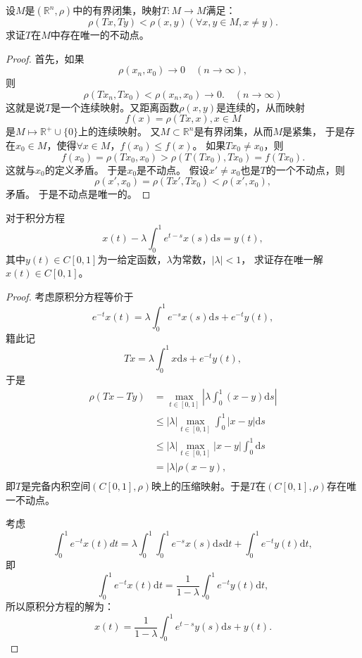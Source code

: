 \begin{exercise}\label{13}
设$M$是$(\mathbb{R}^n,\rho)$中的有界闭集，映射$T:M\rightarrow M$满足：
$$\rho(Tx,Ty)<\rho(x,y)(\forall x,y\in M,x\neq y).$$
求证$T$在$M$中存在唯一的不动点。
\end{exercise}

\begin{proof}
首先，如果$$\rho(x_n,x_0)\rightarrow0\quad(n\rightarrow\infty),$$
则$$\rho(Tx_n,Tx_0)<\rho(x_n,x_0)\rightarrow0.\quad(n\rightarrow\infty)$$
这就是说$T$是一个连续映射。又距离函数$\rho(x,y)$是连续的，从而映射
$$f(x)=\rho(Tx,x),x\in M$$是$M\mapsto\mathbb{R}^+\cup\{0\}$上的连续映射。
又$M\subset\mathbb{R}^n$是有界闭集，从而$M$是紧集，
于是存在$x_0\in M$，使得$\forall x\in M$，$f(x_0)\leq f(x)$。
如果$Tx_0\neq x_0$，则
$$f(x_0)=\rho(Tx_0,x_0)>\rho(T(Tx_0),Tx_0)=f(Tx_0).$$
这就与$x_0$的定义矛盾。
于是$x_0$是不动点。
假设$x'\neq x_0$也是$T$的一个不动点，则
$$\rho(x',x_0)=\rho(Tx',Tx_0)<\rho(x',x_0),$$
矛盾。
于是不动点是唯一的。
\end{proof}

\begin{exercise}
对于积分方程
$$x(t)-\lambda\int_0^1e^{t-s}x(s)\mathrm{d}s=y(t),$$
其中$y(t)\in C[0,1]$为一给定函数，$\lambda$为常数，$|\lambda|<1$，
求证存在唯一解$x(t)\in C[0,1]$。
\end{exercise}

\begin{proof}
考虑原积分方程等价于
$$e^{-t}x(t)=\lambda\int_0^1e^{-s}x(s)\mathrm{d}s+e^{-t}y(t),$$
籍此记
$$Tx=\lambda\int_0^1x\mathrm{d}s+e^{-t}y(t),$$
于是
\begin{align*}
\rho(Tx-Ty)&=\max_{t\in[0,1]}|\lambda\int_0^1(x-y)\mathrm{d}s|\\
&\leq|\lambda|\max_{t\in[0,1]}\int_0^1|x-y|\mathrm{d}s\\
&\leq|\lambda|\max_{t\in[0,1]}|x-y|\int_0^1\mathrm{d}s\\
&=|\lambda|\rho(x-y),\\
\end{align*}
即$T$是完备内积空间$(C[0,1],\rho)$映上的压缩映射。于是$T$在$(C[0,1],\rho)$存在唯一不动点。

考虑
$$\int_0^1e^{-t}x(t)dt=\lambda\int_0^1\int_0^1e^{-s}x(s)\mathrm{d}s\mathrm{d}t+\int_0^1e^{-t}y(t)\mathrm{d}t,$$
即
$$\int_0^1e^{-t}x(t)\mathrm{d}t=\frac{1}{1-\lambda}\int_0^1e^{-t}y(t)\mathrm{d}t,$$
所以原积分方程的解为：
$$x(t)=\frac{1}{1-\lambda}\int_0^1e^{t-s}y(s)\mathrm{d}s+y(t).$$
\end{proof}

